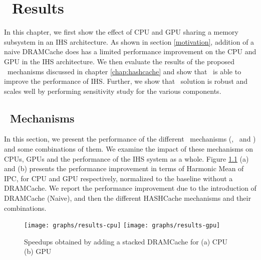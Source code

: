 \chapter{\cachename\ Results} \label{chap:results}
In this chapter, we first show the effect of CPU and GPU sharing a memory subsystem in an IHS architecture. As shown in section \ref{motivation}, addition of a naive DRAMCache does has a limited performance improvement on the CPU and GPU in the IHS architecture. We then evaluate the results of the proposed \cachename\ mechanisms discussed in chapter \ref{chap:hashcache} and show that \cachename\ is able to improve the performance of IHS. Further, we show that \cachename\ solution is robust and scales well by performing sensitivity study for the various components.

\section{\cachename\ Mechanisms}
In this section, we present the performance of the different \cachename\ mechanisms (\prioname, \bypassname\ and \chaining) and some combinations of them. We examine the impact of these mechanisms on CPUs, GPUs and the performance of the IHS system as a whole. Figure \ref{results-speedup} (a) and (b) presents the performance improvement in terms of Harmonic Mean of IPC, for CPU and GPU respectively, normalized to the baseline without a DRAMCache. We report the performance improvement due to the introduction of DRAMCache (Naive),  and then the different HASHCache mechanisms  and their combinations.

\begin{figure}[htb]
	\centering
	\texttt{[image: graphs/results-cpu]}
	\texttt{[image: graphs/results-gpu]}
	\caption{Speedups obtained by adding a stacked DRAMCache for (a) CPU (b) GPU}
	\label{results-speedup}
\end{figure}

